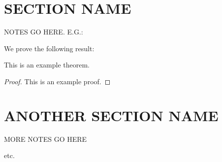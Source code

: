 \documentclass[12pt]{article}
\begin{document}
\MakeScribeTop

\section{SECTION NAME}

NOTES GO HERE.  E.G.:

We prove the following result:
\begin{theorem}
    This is an example theorem.
\end{theorem}
\begin{proof}
    This is an example proof.
\end{proof}

\section{ANOTHER SECTION NAME}

MORE NOTES GO HERE

etc.

               
\end{document}
